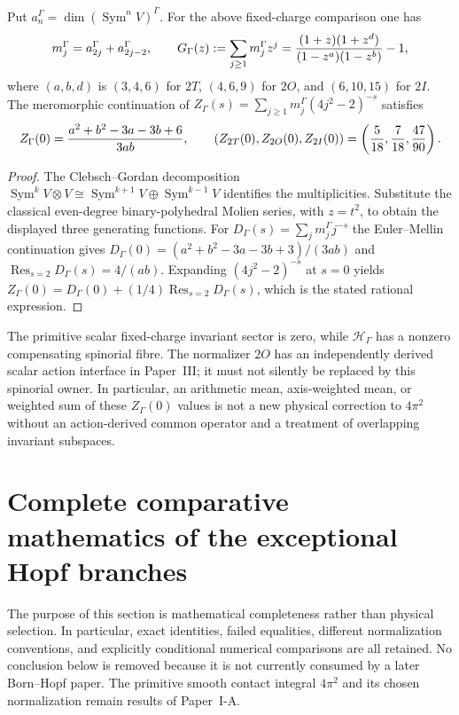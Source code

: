\documentclass[11pt]{article}
\begin{document}
\begin{proposition}
\label{p1b:prop:new-twisted-exceptional-zeta}
Put $a_n^\Gamma=\dim(\operatorname{Sym}^nV)^\Gamma$.  For the above
fixed-charge comparison one has
\[
 m_j^\Gamma=a_{2j}^\Gamma+a_{2j-2}^\Gamma,
\qquad
 G_\Gamma(z):=\sum_{j\ge1}m_j^\Gamma z^j
 ={(1+z)(1+z^d)\over(1-z^a)(1-z^b)}-1,
\]
where $(a,b,d)$ is $(3,4,6)$ for $2T$, $(4,6,9)$ for $2O$, and
$(6,10,15)$ for $2I$.  The meromorphic continuation of
$Z_\Gamma(s)=\sum_{j\ge1}m_j^\Gamma(4j^2-2)^{-s}$ satisfies
\[
 Z_\Gamma(0)={a^2+b^2-3a-3b+6\over3ab},
 \qquad
 (Z_{2T}(0),Z_{2O}(0),Z_{2I}(0))=
 \left({5\over18},{7\over18},{47\over90}\right).
\]
\end{proposition}
\begin{proof}
The Clebsch--Gordan decomposition
$\operatorname{Sym}^kV\otimes V\cong
\operatorname{Sym}^{k+1}V\oplus\operatorname{Sym}^{k-1}V$
identifies the multiplicities.  Substitute the classical even-degree
binary-polyhedral Molien series, with $z=t^2$, to obtain the displayed
three generating functions.  For $D_\Gamma(s)=\sum_jm_j^\Gamma j^{-s}$
the Euler--Mellin continuation gives
$D_\Gamma(0)=(a^2+b^2-3a-3b+3)/(3ab)$ and
$\operatorname{Res}_{s=2}D_\Gamma(s)=4/(ab)$.
Expanding $(4j^2-2)^{-s}$ at $s=0$ yields
$Z_\Gamma(0)=D_\Gamma(0)+(1/4)\operatorname{Res}_{s=2}D_\Gamma(s)$,
which is the stated rational expression.
\end{proof}

\begin{remark}
The primitive scalar fixed-charge invariant sector is zero, while
$\mathscr H_\Gamma$ has a nonzero compensating spinorial fibre.  The
normalizer $2O$ has an independently derived scalar action interface in
Paper~III; it must not silently be replaced by this spinorial owner.
In particular, an arithmetic mean, axis-weighted mean, or weighted sum of
these $Z_\Gamma(0)$ values is not a new physical correction to
$4\pi^2$ without an action-derived common operator and a treatment of
overlapping invariant subspaces.
\end{remark}

\clearpage
\section{Complete comparative mathematics of the exceptional Hopf branches}
\label{p1b:sec:v11-complete-exceptional-comparisons}

The purpose of this section is mathematical completeness rather than physical
selection.  In particular, exact identities, failed equalities, different
normalization conventions, and explicitly conditional numerical comparisons
are all retained.  No conclusion below is removed because it is not currently
consumed by a later Born--Hopf paper.  The primitive smooth contact integral
$4\pi^2$ and its chosen normalization remain results of Paper~I-A.
\end{document}
